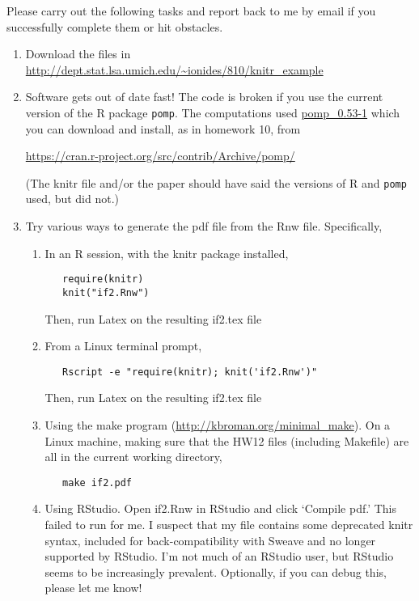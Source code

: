 \documentclass[12pt]{article}
\begin{document}
Please carry out the following tasks and report back to me by email if you successfully complete them or hit obstacles.
\begin{enumerate}
\item Download the files in
\url{http://dept.stat.lsa.umich.edu/~ionides/810/knitr_example}

\item Software gets out of date fast! The code is broken if you use the current version of the R package \texttt{pomp}. The computations used \url{pomp_0.53-1} which you can download and install, as in homework 10, from

\url{https://cran.r-project.org/src/contrib/Archive/pomp/}

(The knitr file and/or the paper should have said the versions of R and \texttt{pomp} used, but did not.)

\item Try various ways to generate the pdf file from the Rnw file. Specifically, 
\begin{enumerate}
\item In an R session, with the knitr package installed,
\begin{verbatim}
   require(knitr)
   knit("if2.Rnw")
\end{verbatim}
   Then, run Latex on the resulting if2.tex file

\item From a Linux terminal prompt,
\begin{verbatim}
   Rscript -e "require(knitr); knit('if2.Rnw')"
\end{verbatim}
Then, run Latex on the resulting if2.tex file

\item Using the make program (\url{http://kbroman.org/minimal_make}).
On a Linux machine, making sure that the HW12 files (including Makefile) are all in the current working directory,
\begin{verbatim}
   make if2.pdf
\end{verbatim}

\item Using RStudio. Open if2.Rnw in RStudio and click `Compile pdf.'
   This failed to run for me. I suspect that my file contains some deprecated knitr syntax, included for back-compatibility with Sweave and no longer supported by RStudio. I'm not much of an RStudio user, but RStudio seems to be increasingly prevalent. Optionally, if you can debug this, please let me know!
\end{enumerate}


\end{enumerate}
\end{document}
